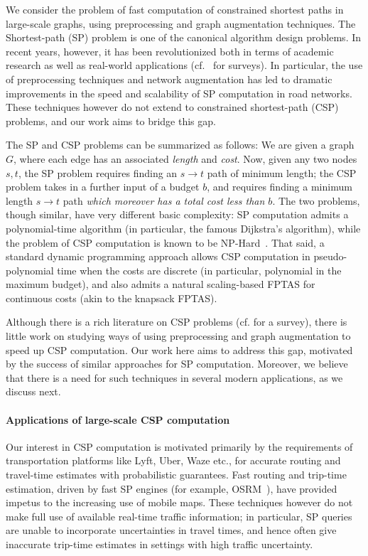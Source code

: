 We consider the problem of fast computation of constrained shortest paths in large-scale graphs, using preprocessing and graph augmentation techniques.
The Shortest-path (SP) problem is one of the canonical algorithm design problems.
In recent years, however, it has been revolutionized both in terms of academic research as well as real-world applications (cf.~\cite{goldberg_survey,dimacs09} for surveys).
In particular, the use of preprocessing techniques and network augmentation has led to dramatic improvements in the speed and scalability of SP computation in road networks.
These techniques however do not extend to constrained shortest-path (CSP) problems, and our work aims to bridge this gap.

The SP and CSP problems can be summarized as follows: We are given a graph $G$, where each edge has an associated \emph{length} and \emph{cost}. 
Now, given any two nodes $s,t$, the SP problem requires finding an  $s\rightarrow t$ path of minimum length; the CSP problem takes in a further input of a budget $b$, and requires finding a minimum length $s\rightarrow t$ path \emph{which moreover has a total cost less than $b$}.
The two problems, though similar, have very different basic complexity: SP computation admits a polynomial-time algorithm (in particular, the famous Dijkstra's algorithm), while the problem of CSP computation is known to be NP-Hard~\cite{csp_survey}.
That said, a standard dynamic programming approach allows CSP computation in pseudo-polynomial time when the costs are discrete (in particular, polynomial in the maximum budget), and also admits a natural scaling-based FPTAS for continuous costs (akin to the knapsack FPTAS).

Although there is a rich literature on CSP problems (cf. \cite{csp_survey} for a survey), there is little work on studying ways of using preprocessing and graph augmentation to speed up CSP computation. Our work here aims to address this gap, motivated by the success of similar approaches for SP computation. Moreover, we believe that there is a need for such techniques in several modern applications, as we discuss next. 


\paragraph*{Applications of large-scale CSP computation}

Our interest in CSP computation is motivated primarily by the requirements of transportation platforms like Lyft, Uber, Waze etc., for accurate routing and travel-time estimates with probabilistic guarantees.
Fast routing and trip-time estimation, driven by fast SP engines (for example, OSRM~\cite{OSRM}), have provided impetus to the increasing use of mobile maps.
These techniques however do not make full use of available real-time traffic information; in particular, SP queries are unable to incorporate uncertainties in travel times, and hence often give inaccurate trip-time estimates in settings with high traffic uncertainty.


